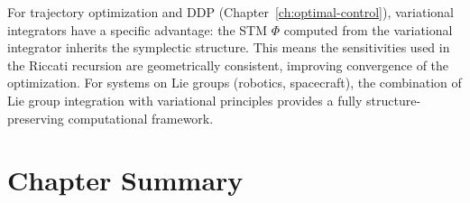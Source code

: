 \begin{designbox}
For trajectory optimization and DDP (Chapter~\ref{ch:optimal-control}), variational
integrators have a specific advantage: the STM $\Phi$ computed from the variational
integrator inherits the symplectic structure. This means the sensitivities used in the
Riccati recursion are geometrically consistent, improving convergence of the optimization.
For systems on Lie groups (robotics, spacecraft), the combination of Lie group integration
with variational principles provides a fully structure-preserving computational framework.
\end{designbox}


\section{Chapter Summary}

